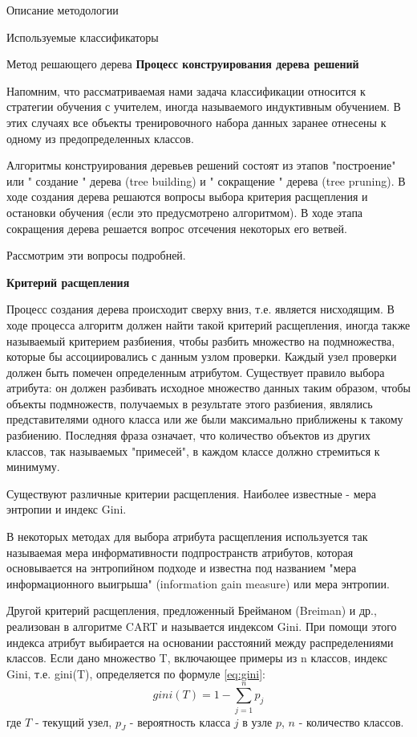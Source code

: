 \begin{section}{Описание методологии}
\begin{subsection}{Используемые классификаторы}
\begin{subsubsection}{Метод решающего дерева}
\textbf{Процесс конструирования дерева решений}

Напомним, что рассматриваемая нами задача классификации относится к стратегии обучения с учителем, иногда называемого индуктивным обучением. В этих случаях все объекты тренировочного набора данных заранее отнесены к одному из предопределенных классов.

Алгоритмы конструирования деревьев решений состоят из этапов "построение" или " создание " дерева (tree building) и " сокращение " дерева (tree pruning). В ходе создания дерева решаются вопросы выбора критерия расщепления и остановки обучения (если это предусмотрено алгоритмом). В ходе этапа сокращения дерева решается вопрос отсечения некоторых его ветвей.

Рассмотрим эти вопросы подробней.

\textbf{Критерий расщепления}

Процесс создания дерева происходит сверху вниз, т.е. является нисходящим. В ходе процесса алгоритм должен найти такой критерий расщепления, иногда также называемый критерием разбиения, чтобы разбить множество на подмножества, которые бы ассоциировались с данным узлом проверки. Каждый узел проверки должен быть помечен определенным атрибутом. Существует правило выбора атрибута: он должен разбивать исходное множество данных таким образом, чтобы объекты подмножеств, получаемых в результате этого разбиения, являлись представителями одного класса или же были максимально приближены к такому разбиению. Последняя фраза означает, что количество объектов из других классов, так называемых "примесей", в каждом классе должно стремиться к минимуму.

Существуют различные критерии расщепления. Наиболее известные - мера энтропии и индекс Gini.

В некоторых методах для выбора атрибута расщепления используется так называемая мера информативности подпространств атрибутов, которая основывается на энтропийном подходе и известна под названием "мера информационного выигрыша" (information gain measure) или мера энтропии.

Другой критерий расщепления, предложенный Брейманом (Breiman) и др., реализован в алгоритме CART и называется индексом Gini. При помощи этого индекса атрибут выбирается на основании расстояний между распределениями классов.
Если дано множество T, включающее примеры из n классов, индекс Gini, т.е. gini(T), определяется по формуле \ref{eq:gini}:
\begin{equation}
  \label{eq:gini}
  gini(T)=1 - \sum\limits_{j=1}^n p_j
\end{equation}
где $T$ - текущий узел, $p_J$ - вероятность класса $j$ в узле $p$, $n$  - количество классов.


\end{subsubsection}
\end{subsection}
\end{section}
